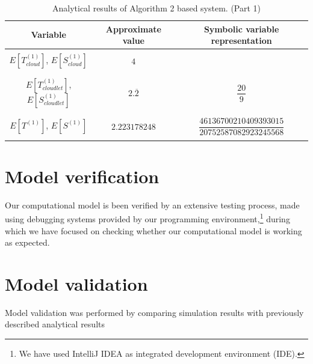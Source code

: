 \documentclass[10pt,a4paper]{article}
\begin{document}
\begin{table}[h!]
\caption{Analytical results of Algorithm 2 based system. (Part 1)}
\begin{adjustbox}{center=\textwidth}
	
     \begin{tabular}{c|c|c}
     \toprule
     \textbf{Variable} & \textbf{Approximate value} & \textbf{Symbolic variable representation} \\
     \toprule
	 
	 &&\\

	 $E[T^{(1)}_{cloud}]$, $E[S^{(1)}_{cloud}]$ & $4$ & \\
     
     &&\\\hline &&\\
     
     $E[T^{(1)}_{cloudlet}]$, $E[S^{(1)}_{cloudlet}]$ & $2.\overline{2}$ & $\dfrac{20}{9}$  \\

	 &&\\\hline &&\\

	 $E[T^{(1)}]$, $E[S^{(1)}]$ & $2.223178248$ & $\dfrac{46136700210409393015}{20752587082923245568}$  \\

	 &&\\


     \bottomrule

    \end{tabular}
    \end{adjustbox}
\end{table}

\clearpage
\newpage
\section{Model verification}

Our computational model is been verified by an extensive testing process, made using debugging systems provided by our programming environment,\footnote{We have used IntelliJ IDEA as integrated development environment (IDE).} during which we have focused on checking whether our computational model is working as expected.

\section{Model validation}

Model validation was performed by comparing simulation results with previously described analytical results
\end{document}
